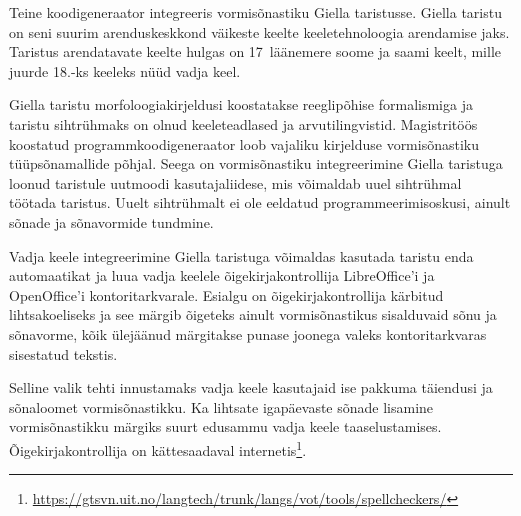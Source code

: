 \documentclass[12pt,a4paper]{article}
\begin{document}
Teine koodi\-generaator integreeris vormi\-sõnastiku Giella taristusse. Giella taristu on seni suurim arendus\-keskkond väikeste keelte keele\-tehnoloogia arendamise jaks. Taristus arendatavate keelte hulgas on 17~lääne\-mere soome ja saami keelt, mille juurde 18.-ks keeleks nüüd vadja keel.

Giella taristu morfoloogia\-kirjeldusi koostatakse reegli\-põhise formalismiga ja taristu siht\-rühmaks on olnud keeleteadlased ja arvuti\-lingvistid. Magistritöös koostatud programm\-koodi\-generaator loob vajaliku kirjelduse vormi\-sõnastiku tüüpsõnamallide põhjal.
Seega on vormi\-sõnastiku integreerimine Giella taristuga loonud taristule uut\-moodi kasutaja\-liidese, mis võimaldab uuel sihtrühmal töötada taristus. Uuelt sihtrühmalt ei ole eeldatud programmeerimis\-oskusi, ainult sõnade ja sõna\-vormide tundmine.


Vadja keele integreerimine Giella taristuga võimaldas kasutada taristu enda automaatikat ja luua vadja keelele õige\-kirja\-kontrollija LibreOffice'i ja OpenOffice'i kontori\-tark\-varale. Esialgu on õige\-kirja\-kontrollija kärbitud lihtsa\-koeliseks ja see märgib õigeteks ainult vormi\-sõnastikus sisalduvaid sõnu ja sõnavorme, kõik ülejäänud märgitakse punase joonega valeks kontori\-tarkvaras sisestatud tekstis.

Selline valik tehti innustamaks vadja keele kasutajaid ise pakkuma täiendusi ja sõna\-loomet vormisõnastikku. Ka lihtsate igapäevaste sõnade lisamine vormi\-sõnastikku märgiks suurt edu\-sammu vadja keele taas\-elustamises. Õigekirja\-kontrollija on kättesaadaval internetis\footnote{\url{https://gtsvn.uit.no/langtech/trunk/langs/vot/tools/spellcheckers/}}.

\end{document}
